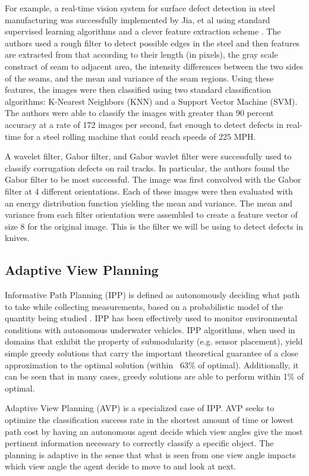 \documentclass[letterpaper, 10 pt, conference]{ieeeconf}  %
\begin{document}
For example, a real-time vision system for surface defect detection in steel manufacturing was successfully implemented by Jia, et al using standard supervised learning algorithms and a clever feature extraction scheme \cite{steelDefect}. The authors used a rough filter to detect possible edges in the steel and then features are extracted from that according to their length (in pixels), the gray scale constract of seam to adjacent area, the intensity differences between the two sides of the seams, and the mean and variance of the seam regions. Using these features, the images were then classified using two standard classification algorithms: K-Nearest Neighbors (KNN) and a Support Vector Machine (SVM). The authors were able to classify the images with greater than 90 percent accuracy at a rate of 172 images per second, fast enough to detect defects in real-time for a steel rolling machine that could reach speeds of 225 MPH.

A wavelet filter, Gabor filter, and Gabor wavlet filter were successfully used to classify corrugation defects on rail tracks\cite{railDefect}. In particular, the authors found the Gabor filter to be most successful. The image was first convolved with the Gabor filter at 4 different orientations. Each of these images were then evaluated with an energy distribution function yielding the mean and variance.  The mean and variance from each filter orientation were assembled to create a feature vector of size 8 for the original image. This is the filter we will be using to detect defects in knives.

\subsection{Adaptive View Planning}

Informative Path Planning (IPP) is defined as autonomously deciding what path to take while collecting measurements, based on a probabilistic model of the quantity being studied \cite{BNBIPP}. IPP has been effectively used to monitor environmental conditions with autonomous underwater vehicles\cite{BNBIPP}\cite{underwaterIPP}. IPP algorithms, when used in domains that exhibit the property of submodularity (e.g. sensor placement), yield simple greedy solutions that carry the important theoretical guarantee of a close approximation to the optimal solution (within ~63\% of optimal). Additionally, it can be seen that in many cases, greedy solutions are able to perform within 1\% of optimal. 

Adaptive View Planning (AVP) is a specialized case of IPP. AVP seeks to optimize the classification success rate in the shortest amount of time or lowest path cost by having an autonomous agent decide which view angles give the most pertinent information necessary to correctly classify a specific object. The planning is adaptive in the sense that what is seen from one view angle impacts which view angle the agent decide to move to and look at next\cite{hollinger2011active}. 
\end{document}
